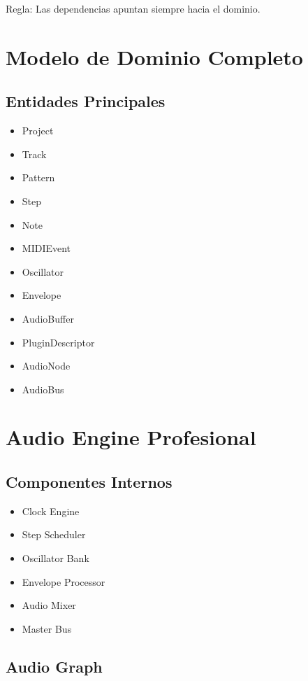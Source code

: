 \documentclass[12pt]{article}
\begin{document}
Regla: Las dependencias apuntan siempre hacia el dominio.

\section{Modelo de Dominio Completo}

\subsection{Entidades Principales}

\begin{itemize}
    \item Project
    \item Track
    \item Pattern
    \item Step
    \item Note
    \item MIDIEvent
    \item Oscillator
    \item Envelope
    \item AudioBuffer
    \item PluginDescriptor
    \item AudioNode
    \item AudioBus
\end{itemize}

\section{Audio Engine Profesional}

\subsection{Componentes Internos}

\begin{itemize}
    \item Clock Engine
    \item Step Scheduler
    \item Oscillator Bank
    \item Envelope Processor
    \item Audio Mixer
    \item Master Bus
\end{itemize}

\subsection{Audio Graph}
\end{document}
